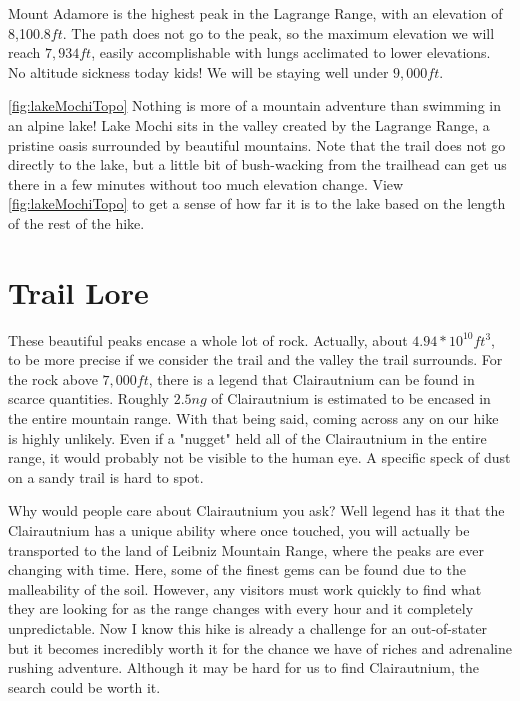 \documentclass[12pt]{article}   %
\theoremstyle{definition}
\numberwithin{equation}{section}
\begin{document}
\quad Mount Adamore is the highest peak in the Lagrange Range, with an elevation of 8,100.8$ft$. The path does not go to the peak, so the maximum elevation we will reach $7,934ft$, easily accomplishable with lungs acclimated to lower elevations. No altitude sickness today kids! We will be staying well under $9,000ft$.





\quad \autoref{fig:lakeMochiTopo} Nothing is more of a mountain adventure than swimming in an alpine lake! Lake Mochi sits in the valley created by the Lagrange Range, a pristine oasis surrounded by beautiful mountains. Note that the trail does not go directly to the lake, but a little bit of bush-wacking from the trailhead can get us there in a few minutes without too much elevation change. View \autoref{fig:lakeMochiTopo} to get a sense of how far it is to the lake based on the length of the rest of the hike.
\section{Trail Lore} \label{APPM2350proj02sec05}

\quad These beautiful peaks encase a whole lot of rock. Actually, about $4.94*10^{10}ft^3$, to be more precise if we consider the trail and the valley the trail surrounds. For the rock above $7,000ft$, there is a legend that Clairautnium can be found in scarce quantities. Roughly $2.5ng$ of Clairautnium is estimated to be encased in the entire mountain range. With that being said, coming across any on our hike is highly unlikely. Even if a "nugget" held all of the Clairautnium in the entire range, it would probably not be visible to the human eye. A specific speck of dust on a sandy trail is hard to spot.

\quad Why would people care about Clairautnium you ask? Well legend has it that the Clairautnium has a unique ability where once touched, you will actually be transported to the land of Leibniz Mountain Range, where the peaks are ever changing with time. Here, some of the finest gems can be found due to the malleability of the soil. However, any visitors must work quickly to find what they are looking for as the range changes with every hour and it completely unpredictable. Now I know this hike is already a challenge for an out-of-stater but it becomes incredibly worth it for the chance we have of riches and adrenaline rushing adventure. Although it may be hard for us to find Clairautnium, the search could be worth it.
\end{document}
